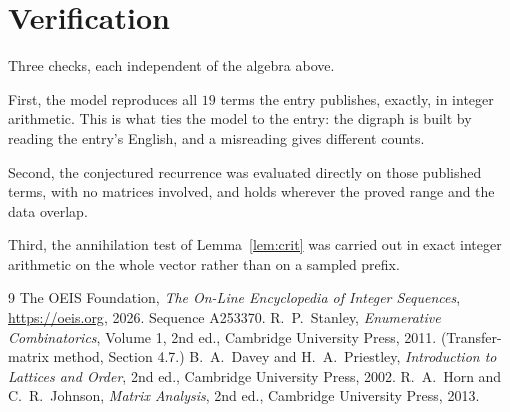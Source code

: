 \documentclass[11pt,a4paper]{article}
\theoremstyle{plain}
\theoremstyle{definition}
\begin{document}
\section{Verification}

Three checks, each independent of the algebra above.

First, the model reproduces all $19$ terms the entry publishes, exactly, in integer
arithmetic. This is what ties the model to the entry: the digraph is built by reading the
entry's English, and a misreading gives different counts.

Second, the conjectured recurrence was evaluated directly on those published terms, with no
matrices involved, and holds wherever the proved range and the data overlap.

Third, the annihilation test of Lemma~\ref{lem:crit} was carried out in exact integer
arithmetic on the whole vector rather than on a sampled prefix.

\begin{thebibliography}{9}
 The OEIS Foundation, \emph{The On-Line Encyclopedia of Integer
Sequences}, \url{https://oeis.org}, 2026. Sequence A253370.
 R.~P.~Stanley, \emph{Enumerative Combinatorics}, Volume 1, 2nd ed.,
Cambridge University Press, 2011. (Transfer-matrix method, Section 4.7.)
 B.~A.~Davey and H.~A.~Priestley, \emph{Introduction to Lattices and
Order}, 2nd ed., Cambridge University Press, 2002.
 R.~A.~Horn and C.~R.~Johnson, \emph{Matrix Analysis}, 2nd ed., Cambridge
University Press, 2013.
\end{thebibliography}
\end{document}
